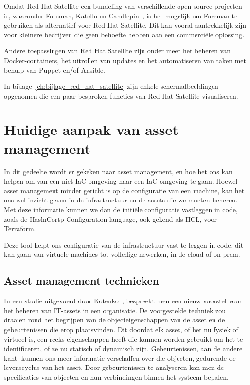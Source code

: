 Omdat Red Hat Satellite een bundeling van verschillende open-source projecten is, waaronder Foreman, Katello en Candlepin~\autocite{rhel-satellite-6-introduction}, is het mogelijk om Foreman te gebruiken als alternatief voor Red Hat Satellite.
Dit kan vooral aantrekkelijk zijn voor kleinere bedrijven die geen behoefte hebben aan een commerci\"ele oplossing.

Andere toepassingen van Red Hat Satellite zijn onder meer het beheren van Docker-containers, het uitrollen van updates en het automatiseren van taken met behulp van Puppet en/of Ansible.

In bijlage~\ref{ch:bijlage_red_hat_satellite} zijn enkele schermafbeeldingen opgenomen die een paar besproken functies van Red Hat Satellite visualiseren.

\section{Huidige aanpak van asset management}%
\label{sec:huidige-aanpak-van-asset-management}

In dit gedeelte wordt er gekeken naar asset management, en hoe het ons kan helpen om van een niet IaC omgeving naar een IaC omgeving te gaan.
Hoewel asset management minder gericht is op de configuratie van een machine, kan het ons wel inzicht geven in de infrastructuur en de assets die we moeten beheren.
Met deze informatie kunnen we dan de initi\"ele configuratie vastleggen in code, zoals de HashiCortp Configuration language, ook gekend als HCL, voor Terraform.

Deze tool helpt ons configuratie van de infrastructuur vast te leggen in code, dit kan gaan van virtuele machines tot volledige newerken, in de cloud of on-prem.

\subsection{Asset management technieken}%
\label{sub:asset-management-technieken}

In een studie uitgevoerd door Kotenko~\autocite{Kotenko2022}, bespreekt men een nieuw voorstel voor het beheren van IT-assets in een organisatie.
De voorgestelde techniek zou draaien rond het begrijpen van de objecteigenschappen van de asset en de gebeurtenissen die erop plaatsvinden.
Dit doordat elk asset, of het nu fysiek of virtueel is, een reeks eigenschappen heeft die kunnen worden gebruikt om het te identificeren, of ze nu statisch of dynamisch zijn.
Gebeurtenissen, aan de andere kant, kunnen ons meer informatie verschaffen over die objecten, gedurende de levenscyclus van het asset.
Door gebeurtenissen te analyseren kan men de specificaties van objecten en hun verbindingen binnen het systeem bepalen.

